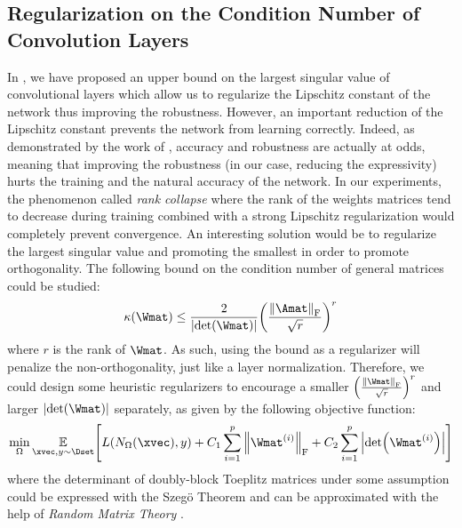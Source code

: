 \subsection{Regularization on the Condition Number of Convolution Layers}


In , we have proposed an upper bound on the largest singular value of convolutional layers which allow us to regularize the Lipschitz constant of the network thus improving the robustness.
However, an important reduction of the Lipschitz constant prevents the network from learning correctly. 
Indeed, as demonstrated by the work of \cite{zhang2019theoretically}, accuracy and robustness are actually at odds, meaning that improving the robustness (\ie in our case, reducing the expressivity) hurts the training and the natural accuracy of the network. 
In our experiments, the phenomenon called \emph{rank collapse} \cite{saxe2014exact} where the rank of the weights matrices tend to decrease during training combined with a strong Lipschitz regularization would completely prevent convergence.
An interesting solution would be to regularize the largest singular value and promoting the smallest in order to promote orthogonality.
The following bound on the condition number of general matrices \citet{guggenheimer1995simple} could be studied:
\begin{equation}
  \kappa(\Wmat) \le \frac{2}{\abs{\det(\Wmat)}} \left(\frac{\norm{\Amat}_\fro}{\sqrt{r}}\right)^r
\end{equation}
where $r$ is the rank of $\Wmat$.
As such, using the bound as a regularizer will penalize the non-orthogonality, just like a layer normalization.
Therefore, we could design some heuristic regularizers to encourage a smaller $\left(\frac{\norm{\Wmat}_\fro}{\sqrt{r}}\right)^r$ and larger $\abs{\det(\Wmat)}$ separately, as given by the following objective function: 
\begin{align} 
  \min_{\Omega} \Ebb_{\xvec, y \sim \Dset} \left[ L(N_\Omega(\xvec), y)  + C_1 \sum_{i=1}^\depth \norm{\Wmat^{(i)}}_\fro + C_2 \sum_{i=1}^{\depth} \abs{\det(\Wmat^{(i)})} \right]
\end{align}
where the determinant of doubly-block Toeplitz matrices under some assumption could be expressed with the Szeg\"{o} Theorem \cite{szego1915grenzwertsatz} and can be approximated with the help of \emph{Random Matrix Theory} \cite{basor2017asymptotics}.

